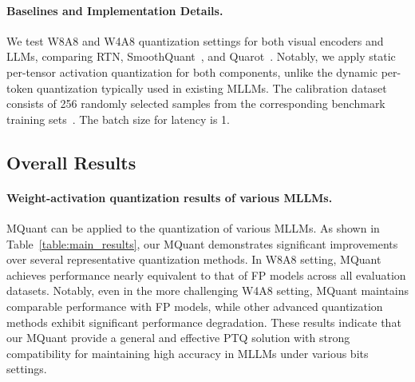 \vspace{-2mm}
\paragraph{Baselines and Implementation Details.} We test W8A8 and W4A8 quantization settings for both visual encoders and LLMs, comparing RTN, SmoothQuant~\citep{xiao2022smoothquant}, and Quarot~\citep{ashkboos2024quarot}. Notably, we apply static per-tensor activation quantization for both components, unlike the dynamic per-token quantization typically used in existing MLLMs. The calibration dataset consists of 256 randomly selected samples from the corresponding benchmark training sets~\citep{singh2019textvqa, mathew2021docvqa, liu2023ocrbench}. The batch size for latency is 1.

\vspace{-3.5mm}
\subsection{Overall Results}
\vspace{-2mm}

\paragraph{Weight-activation quantization results of various MLLMs.} MQuant can be applied to the quantization of various MLLMs. As shown in Table~\ref{table:main_results}, our MQuant demonstrates significant improvements over several representative quantization methods. In W8A8 setting, MQuant achieves performance nearly equivalent to that of FP models across all evaluation datasets. Notably, even in the more challenging W4A8 setting, MQuant maintains comparable performance with FP models, while other advanced quantization methods exhibit significant performance degradation. These results indicate that our MQuant provide a general and effective PTQ solution with strong compatibility for maintaining high accuracy in MLLMs under various bits settings.


\begin{table}[h]
\vspace{-2mm}
\caption{Speedup of MSQ + AIFS on W4A8 setting.}
\vspace{-2mm}
\label{tab:speed_decode}
\centering
\Huge
{}
\vspace{-6mm}
\end{table}


